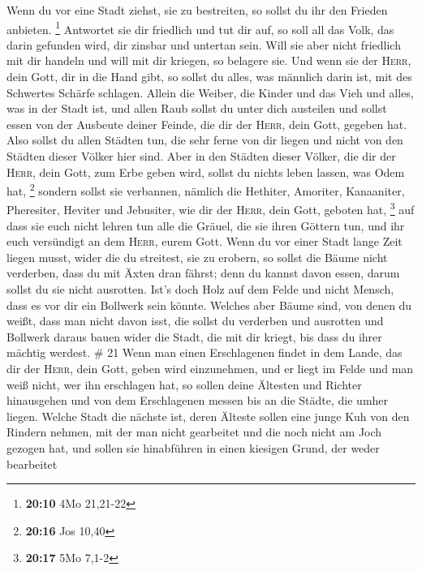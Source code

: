 Wenn du vor eine Stadt ziehst, sie zu bestreiten, so
sollst du ihr den Frieden anbieten. \footnote{\textbf{20:10} 4Mo
  21,21-22}  Antwortet sie dir friedlich und tut dir auf,
so soll all das Volk, das darin gefunden wird, dir zinsbar und untertan
sein.  Will sie aber nicht friedlich mit dir handeln und
will mit dir kriegen, so belagere sie.  Und wenn sie der
\textsc{Herr}, dein Gott, dir in die Hand gibt, so sollst du alles, was
männlich darin ist, mit des Schwertes Schärfe schlagen. 
Allein die Weiber, die Kinder und das Vieh und alles, was in der Stadt
ist, und allen Raub sollst du unter dich austeilen und sollst essen von
der Ausbeute deiner Feinde, die dir der \textsc{Herr}, dein Gott,
gegeben hat.  Also sollst du allen Städten tun, die sehr
ferne von dir liegen und nicht von den Städten dieser Völker hier sind.
 Aber in den Städten dieser Völker, die dir der
\textsc{Herr}, dein Gott, zum Erbe geben wird, sollst du nichts leben
lassen, was Odem hat, \footnote{\textbf{20:16} Jos 10,40}
 sondern sollst sie verbannen, nämlich die Hethiter,
Amoriter, Kanaaniter, Pheresiter, Heviter und Jebusiter, wie dir der
\textsc{Herr}, dein Gott, geboten hat, \footnote{\textbf{20:17} 5Mo
  7,1-2}  auf dass sie euch nicht lehren tun alle die
Gräuel, die sie ihren Göttern tun, und ihr euch versündigt an dem
\textsc{Herr}, eurem Gott.  Wenn du vor einer Stadt lange
Zeit liegen musst, wider die du streitest, sie zu erobern, so sollst die
Bäume nicht verderben, dass du mit Äxten dran fährst; denn du kannst
davon essen, darum sollst du sie nicht ausrotten. Ist's doch Holz auf
dem Felde und nicht Mensch, dass es vor dir ein Bollwerk sein könnte.
 Welches aber Bäume sind, von denen du weißt, dass man
nicht davon isst, die sollst du verderben und ausrotten und Bollwerk
daraus bauen wider die Stadt, die mit dir kriegt, bis dass du ihrer
mächtig werdest. \# 21  Wenn man einen Erschlagenen findet
in dem Lande, das dir der \textsc{Herr}, dein Gott, geben wird
einzunehmen, und er liegt im Felde und man weiß nicht, wer ihn
erschlagen hat,  so sollen deine Ältesten und Richter
hinausgehen und von dem Erschlagenen messen bis an die Städte, die umher
liegen.  Welche Stadt die nächste ist, deren Älteste
sollen eine junge Kuh von den Rindern nehmen, mit der man nicht
gearbeitet und die noch nicht am Joch gezogen hat,  und
sollen sie hinabführen in einen kiesigen Grund, der weder bearbeitet
